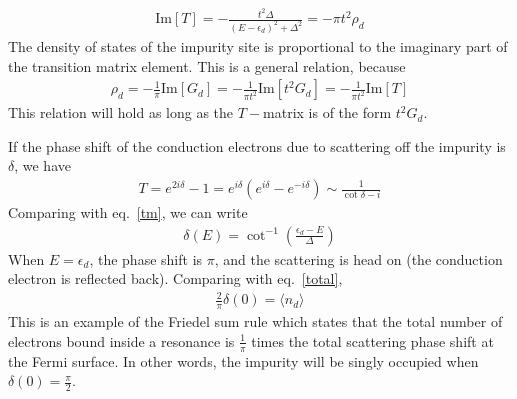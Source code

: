 \begin{equation}\begin{aligned}
	\label{dsfromtmat}
	\text{Im}[T] = -\frac{t^2 \Delta}{\left(E-\epsilon_d\right)^2+\Delta^2} = -\pi t^2 \rho_d
\end{aligned}\end{equation}
The density of states of the impurity site is proportional to the imaginary part of the transition matrix element.
This is a general relation, because
\begin{equation}\begin{aligned}
	\rho_d = -\frac{1}{\pi}\text{Im}\left[G_d\right] = -\frac{1}{\pi t^2}\text{Im}\left[t^2 G_d\right] = -\frac{1}{\pi t^2}\text{Im}\left[T\right]
\end{aligned}\end{equation}
This relation will hold as long as the \(T-\)matrix is of the form \(t^2 G_d\).

If the phase shift of the conduction electrons due to scattering off the impurity is \(\delta\), we have
\begin{equation}\begin{aligned}
	T = e^{2i\delta} - 1 = e^{i\delta}\left(e^{i\delta} - e^{-i\delta}\right) \sim \frac{1}{\cot \delta - i}
\end{aligned}\end{equation}
Comparing with eq.~\ref{tm}, we can write
\begin{equation}\begin{aligned}
	\label{phaseshift}
	\delta(E) = \cot^{-1}\left(\frac{\epsilon_d - E}{\Delta}\right)
\end{aligned}\end{equation}
When \(E = \epsilon_d\), the phase shift is \(\pi\), and the scattering is head on (the conduction electron is reflected back).
Comparing with eq.~\ref{total},
\begin{equation}\begin{aligned}
	\frac{2}{\pi}\delta(0) = \langle  n_d\rangle
\end{aligned}\end{equation}
This is an example of the Friedel sum rule which states that the total number of electrons bound inside a resonance is \(\frac{1}{\pi}\) times the total scattering phase shift at the Fermi surface.
In other words, the impurity will be singly occupied when \(\delta(0) = \frac{\pi}{2}\).

